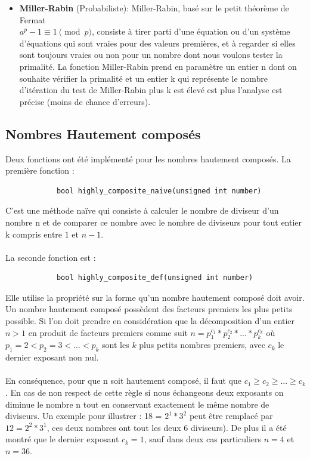 \begin{itemize}
			\item \textbf{Miller-Rabin} (Probabiliste): Miller-Rabin, basé sur le petit théorème de Fermat \\ $a^p-1 \equiv 1 \pmod p$, consiste à tirer parti d'une équation ou d'un système d'équations qui sont vraies pour des valeurs premières, et à regarder si elles sont toujours vraies ou non pour un nombre dont nous voulons tester la primalité. La fonction Miller-Rabin prend en paramètre un entier n dont on souhaite vérifier la primalité et un entier k qui représente le nombre d’itération du test de Miller-Rabin plus k est élevé est plus l’analyse est précise (moins de chance d’erreurs).\\
		\end{itemize}
		
		\subsection{Nombres Hautement composés}
		Deux fonctions ont été implémenté pour les nombres hautement composés. La première fonction : 				\begin{lstlisting}
			bool highly_composite_naive(unsigned int number)
		\end{lstlisting}
		C'est une méthode naïve qui consiste à calculer le nombre de diviseur d'un nombre n et de comparer ce nombre avec le nombre de diviseurs pour tout entier k compris entre $1$ et $n-1$.
		\paragraph{}La seconde fonction est :
		\begin{lstlisting}
			bool highly_composite_def(unsigned int number)
		\end{lstlisting}
		Elle utilise la propriété sur la forme qu'un nombre hautement composé doit avoir. Un nombre hautement composé possèdent des facteurs premiers les plus petits possible. Si l'on doit prendre en considération que la décomposition d'un entier $n > 1$ en produit de facteurs premiers comme suit  $n = p_1^{c_1} * p_2^{c_2} * ... * p_k^{c_k}$ où $p_1 = 2 < p_2 = 3 < … < p_k$ sont les $k$ plus petits nombres premiers, avec $c_k$ le dernier exposant non nul.
		\paragraph{}En conséquence, pour que n soit hautement composé, il faut que $c_1 \ge c_2 \ge ... \ge c_k$. En cas de non respect de cette règle si nous échangeons deux exposants on diminue le nombre n tout en conservant exactement le même nombre de diviseurs. Un exemple pour illustrer : 18 = $2^1 * 3^2$ peut être remplacé par $12 = 2^2 * 3^1$, ces deux nombres ont tout les deux 6 diviseurs). De plus il a été montré que le dernier exposant $c_k = 1$, sauf dans deux cas particuliers $n = 4$ et $n = 36$.

